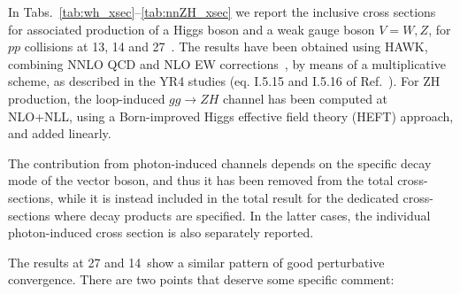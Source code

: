 In Tabs.~\ref{tab:wh_xsec}--\ref{tab:nnZH_xsec}
we report the inclusive cross sections for associated production of a Higgs
boson and a weak gauge boson $V=W,Z$, for $pp$ collisions at 13, 14 and 27~\UTeV.
The results have been obtained using HAWK, combining
NNLO QCD and NLO EW
corrections~\cite{Harlander:2018yio,Denner:2014cla,Harlander:2014wda,
Altenkamp:2012sx,Denner:2011id,Brein:2003wg,Ciccolini:2003jy}, by
means of a multiplicative scheme, as described in the YR4 studies (eq.
I.5.15 and I.5.16 of Ref.~\cite{deFlorian:2016spz}).  For ZH production, the
loop-induced $gg\rightarrow ZH$ channel has been computed at NLO+NLL, using a Born-improved Higgs effective field theory (HEFT) approach, and added linearly.

The contribution from photon-induced channels depends on the specific
decay mode of the vector boson, and thus it has been removed from the
total cross-sections, while it is instead included in the total result
for the dedicated cross-sections where decay products are
specified. In the latter cases, the individual photon-induced cross
section is also separately reported.

The results at 27 and 14~\UTeV show a similar pattern of good
perturbative convergence. There are two points that deserve some
specific comment:

